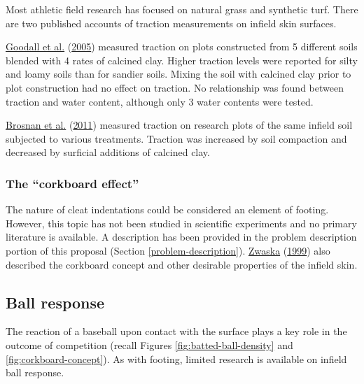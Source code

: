 \documentclass[
  letterpaper,
  openany]{book}
\begin{document}
Most athletic field research has focused on natural grass and synthetic turf.
There are two published accounts of traction measurements on infield skin surfaces.

\protect\hyperlink{ref-Goodall2005}{Goodall et al.} (\protect\hyperlink{ref-Goodall2005}{2005}) measured traction on plots constructed from 5 different soils blended with 4 rates of calcined clay.
Higher traction levels were reported for silty and loamy soils than for sandier soils.
Mixing the soil with calcined clay prior to plot construction had no effect on traction.
No relationship was found between traction and water content, although only 3 water contents were tested.

\protect\hyperlink{ref-Brosnan2011}{Brosnan et al.} (\protect\hyperlink{ref-Brosnan2011}{2011}) measured traction on research plots of the same infield soil subjected to various treatments.
Traction was increased by soil compaction and decreased by surficial additions of calcined clay.

\hypertarget{the-corkboard-effect}{%
\subsubsection{The ``corkboard effect''}\label{the-corkboard-effect}}

The nature of cleat indentations could be considered an element of footing.
However, this topic has not been studied in scientific experiments and no primary literature is available.
A description has been provided in the problem description portion of this proposal (Section \ref{problem-description}).
\protect\hyperlink{ref-Zwaska1999}{Zwaska} (\protect\hyperlink{ref-Zwaska1999}{1999}) also described the corkboard concept and other desirable properties of the infield skin.

\hypertarget{ball-response-lit-review}{%
\subsection{Ball response}\label{ball-response-lit-review}}

The reaction of a baseball upon contact with the surface plays a key role in the outcome of competition (recall Figures \ref{fig:batted-ball-density} and \ref{fig:corkboard-concept}).
As with footing, limited research is available on infield ball response.
\end{document}
